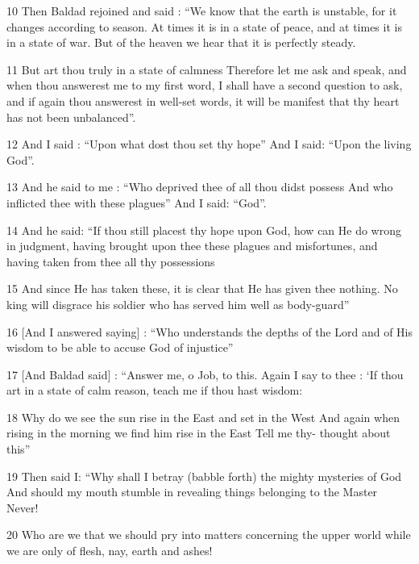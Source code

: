 \par 10 Then Baldad rejoined and said : “We know that the earth is unstable, for it changes according to season. At times it is in a state of peace, and at times it is in a state of war. But of the heaven we hear that it is perfectly steady.

\par 11 But art thou truly in a state of calmness Therefore let me ask and speak, and when thou answerest me to my first word, I shall have a second question to ask, and if again thou answerest in well-set words, it will be manifest that thy heart has not been unbalanced”.

\par 12 And I said : “Upon what dost thou set thy hope” And I said: “Upon the living God”. 

\par 13 And he said to me : “Who deprived thee of all thou didst possess And who inflicted thee with these plagues” And I said: “God”.

\par 14 And he said: “If thou still placest thy hope upon God, how can He do wrong in judgment, having brought upon thee these plagues and misfortunes, and having taken from thee all thy possessions

\par 15 And since He has taken these, it is clear that He has given thee nothing. No king will disgrace his soldier who has served him well as body-guard”

\par 16 [And I answered saying] : “Who understands the depths of the Lord and of His wisdom to be able to accuse God of injustice”

\par 17 [And Baldad said] : “Answer me, o Job, to this. Again I say to thee : ‘If thou art in a state of calm reason, teach me if thou hast wisdom:

\par 18 Why do we see the sun rise in the East and set in the West And again when rising in the morning we find him rise in the East Tell me thy- thought about this”

\par 19 Then said I: “Why shall I betray (babble forth) the mighty mysteries of God And should my mouth stumble in revealing things belonging to the Master Never!

\par 20 Who are we that we should pry into matters concerning the upper world while we are only of flesh, nay, earth and ashes!

